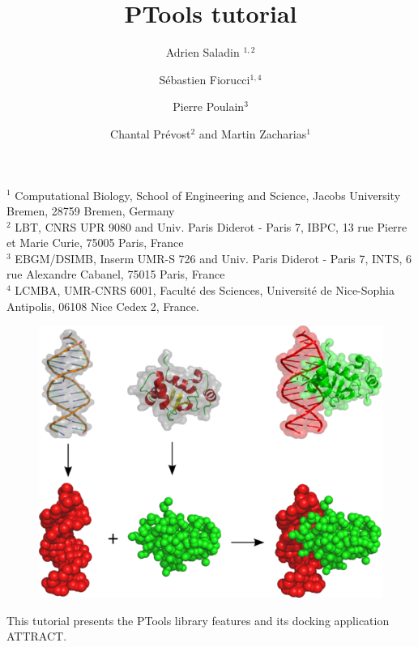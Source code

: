 \documentclass[12pt,a4paper]{article}
\begin{document}
\setlength{\parindent}{0pt}


\title{\bf PTools tutorial}

\author{Adrien Saladin $^{1,2}$
\and S\'ebastien Fiorucci$^{1,4}$
\and Pierre Poulain$^3$
\and Chantal Pr\'evost$^2$
 and Martin Zacharias$^1$
}

\maketitle
\thispagestyle{empty}

\noindent
{\scriptsize
$^1$ Computational Biology, School of Engineering and Science, Jacobs University Bremen, 28759 Bremen, Germany\\
$^2$ LBT, CNRS UPR 9080 and Univ. Paris Diderot - Paris 7, IBPC, 13 rue Pierre et Marie Curie, 75005 Paris, France   \\
$^3$ EBGM/DSIMB, Inserm UMR-S 726 and Univ. Paris Diderot - Paris 7, INTS,
6 rue Alexandre Cabanel, 75015 Paris, France   \\
$^4$ LCMBA, UMR-CNRS 6001, Facult\'e des Sciences, Universit\'e de Nice-Sophia Antipolis, 06108 Nice Cedex 2, France. \\
}

\vspace*{2cm}
\begin{figure}[htbp]
\center
\includegraphics*[width=0.80\linewidth]{img/docking.png}
\end{figure}


\vspace*{3cm}

\noindent
This tutorial presents the PTools library features and its docking application ATTRACT.

\newpage
\end{document}
